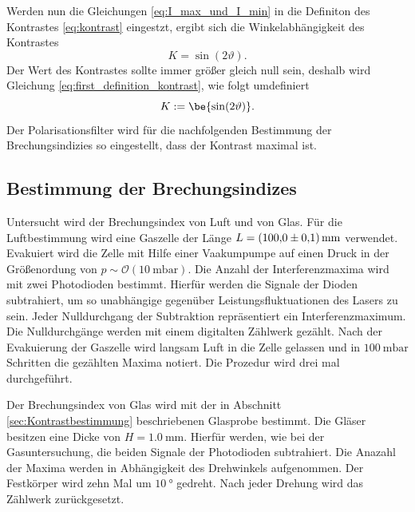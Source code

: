 Werden nun die Gleichungen \eqref{eq:I_max_und_I_min} in die Definiton des Kontrastes \eqref{eq:kontrast}
eingestzt, ergibt sich die Winkelabhängigkeit des Kontrastes
\begin{equation}
  \label{eq:first_definition_kontrast}
  K=\sin(2\vartheta).
\end{equation}
Der Wert des Kontrastes sollte immer größer gleich null sein, deshalb wird Gleichung \eqref{eq:first_definition_kontrast},
wie folgt umdefiniert
\begin{equation}
  \label{eq:definition_dontrast}
  K:=\be{\sin(2\vartheta)}.
\end{equation}
Der Polarisationsfilter wird für die nachfolgenden Bestimmung der Brechungsindizies
so eingestellt, dass der Kontrast maximal ist.
\subsection{Bestimmung der Brechungsindizes}
Untersucht wird der Brechungsindex von Luft und von Glas.
Für die Luftbestimmung wird eine Gaszelle der Länge $L=\SI{100\pm0.1}{\milli\meter}$
verwendet. Evakuiert wird die Zelle mit Hilfe einer Vaakumpumpe auf einen
Druck in der Größenordung von $p\sim\mathcal{O}(\SI{10}{\milli\bar})$.
Die Anzahl der Interferenzmaxima wird mit zwei Photodioden bestimmt.
Hierfür werden die Signale der Dioden subtrahiert, um so unabhängige gegenüber
Leistungsfluktuationen des Lasers zu sein. Jeder Nulldurchgang der Subtraktion
repräsentiert ein Interferenzmaximum. Die Nulldurchgänge werden mit einem digitalten
Zählwerk gezählt. Nach der Evakuierung der Gaszelle wird langsam Luft in die Zelle
gelassen und in $\SI{100}{\milli\bar}$ Schritten die gezählten Maxima notiert. Die Prozedur wird
drei mal durchgeführt.

Der Brechungsindex von Glas wird mit der in Abschnitt \ref{sec:Kontrastbestimmung}
beschriebenen Glasprobe bestimmt. Die Gläser besitzen eine Dicke von $H=\SI{1.0}{\milli\meter}$.
Hierfür werden, wie bei der Gasuntersuchung,
die beiden Signale der Photodioden subtrahiert. Die Anazahl der Maxima
werden in Abhängigkeit des Drehwinkels aufgenommen.
Der Festkörper wird zehn Mal um
$\SI{10}{\degree}$ gedreht. Nach jeder Drehung wird das Zählwerk zurückgesetzt.

